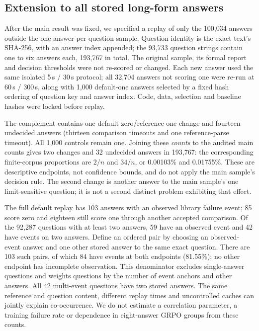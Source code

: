 \documentclass[10pt,a4paper]{article}
\begin{document}
\subsection{Extension to all stored long-form answers}
\label{sec:allanswers}

After the main result was fixed, we specified a replay of only the 100,034
answers outside the one-answer-per-question sample. Question identity is
the exact text's SHA-256, with an answer index appended; the 93,733 question
strings contain one to six answers each, 193,767 in total. The original
sample, its formal report and decision thresholds were not re-scored or
changed. Each new answer used the same isolated 5\,s / 30\,s protocol;
all 32,704 answers not scoring one were re-run at 60\,s / 300\,s, along with
1,000 default-one answers selected by a fixed hash ordering of question
key and answer index. Code, data, selection and baseline hashes were locked
before replay.

The complement contains one default-zero/reference-one change and fourteen
undecided answers (thirteen comparison timeouts and one reference-parse
timeout). All 1,000 controls remain one. Joining these \emph{counts} to the
audited main counts gives two changes and 32 undecided answers in 193,767:
the corresponding finite-corpus proportions are $2/n$ and $34/n$, or
0.00103\% and 0.01755\%. These are descriptive endpoints, not confidence
bounds, and do not apply the main sample's decision rule. The second change
is another answer to the main sample's one limit-sensitive question;
it is not a second distinct problem exhibiting that effect.

The full default replay has 103 answers with an observed library failure
event; 85 score zero and eighteen still score one through another accepted
comparison. Of the 92,287 questions with at least two answers, 59 have an
observed event and 42 have events on two answers. Define an ordered pair
by choosing an observed-event answer and one other stored answer to the
same exact question. There are 103 such pairs, of which 84 have events at
both endpoints (81.55\%); no other endpoint has incomplete observation.
This denominator excludes single-answer questions and weights questions
by the number of event anchors and other answers. All 42 multi-event
questions have two stored answers. The same reference and question content,
different replay times and uncontrolled caches can jointly explain
co-occurrence. We do not estimate a correlation parameter, a training
failure rate or dependence in eight-answer GRPO groups from these counts.
\end{document}
